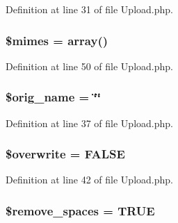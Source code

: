 Definition at line 31 of file Upload.\+php.

\subsubsection[{\texorpdfstring{\$mimes}{$mimes}}]{\setlength{\rightskip}{0pt plus 5cm}\$mimes = array()}\hypertarget{class_c_i___upload_a2ce7d338d1fd0f0d971ba6213ac298a2}{}\label{class_c_i___upload_a2ce7d338d1fd0f0d971ba6213ac298a2}


Definition at line 50 of file Upload.\+php.

\subsubsection[{\texorpdfstring{\$orig\+\_\+name}{$orig_name}}]{\setlength{\rightskip}{0pt plus 5cm}\$orig\+\_\+name = \char`\"{}\char`\"{}}\hypertarget{class_c_i___upload_a2704f7723b97b03285de219442ae3e2b}{}\label{class_c_i___upload_a2704f7723b97b03285de219442ae3e2b}


Definition at line 37 of file Upload.\+php.

\subsubsection[{\texorpdfstring{\$overwrite}{$overwrite}}]{\setlength{\rightskip}{0pt plus 5cm}\$overwrite = F\+A\+L\+SE}\hypertarget{class_c_i___upload_a8d31b0ad9cccde7e2d857097672ed6cf}{}\label{class_c_i___upload_a8d31b0ad9cccde7e2d857097672ed6cf}


Definition at line 42 of file Upload.\+php.

\subsubsection[{\texorpdfstring{\$remove\+\_\+spaces}{$remove_spaces}}]{\setlength{\rightskip}{0pt plus 5cm}\$remove\+\_\+spaces = T\+R\+UE}\hypertarget{class_c_i___upload_ad9f32a52b4b2c16e42a007e0fa832721}{}\label{class_c_i___upload_ad9f32a52b4b2c16e42a007e0fa832721}


